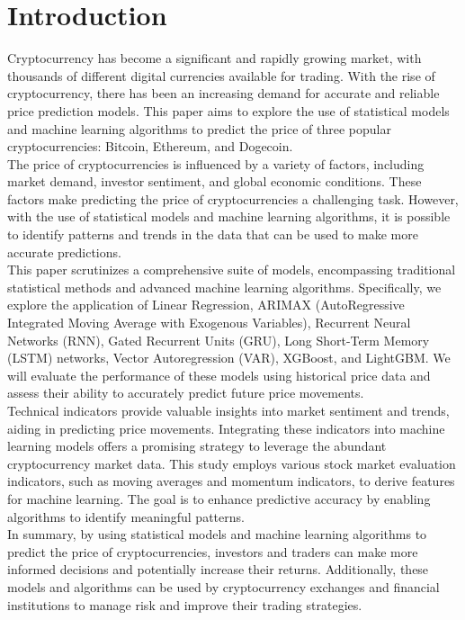 \documentclass{ieeeojies}
\begin{document}
\section{Introduction}
\label{sec:introduction}
\indent Cryptocurrency has become a significant and rapidly growing market, with thousands of different digital currencies available for trading. With the rise of cryptocurrency, there has been an increasing demand for accurate and reliable price prediction models. This paper aims to explore the use of statistical models and machine learning algorithms to predict the price of three popular cryptocurrencies: Bitcoin, Ethereum, and Dogecoin.\\
\indent The price of cryptocurrencies is influenced by a variety of factors, including market demand, investor sentiment, and global economic conditions. These factors make predicting the price of cryptocurrencies a challenging task. However, with the use of statistical models and machine learning algorithms, it is possible to identify patterns and trends in the data that can be used to make more accurate predictions.\\
\indent This paper scrutinizes a comprehensive suite of models, encompassing traditional statistical methods and advanced machine learning algorithms. Specifically, we explore the application of Linear Regression, ARIMAX (AutoRegressive Integrated Moving Average with Exogenous Variables), Recurrent Neural Networks (RNN), Gated Recurrent Units (GRU), Long Short-Term Memory (LSTM) networks, Vector Autoregression (VAR), XGBoost, and LightGBM. We will evaluate the performance of these models using historical price data and assess their ability to accurately predict future price movements.\\
\indent Technical indicators provide valuable insights into market sentiment and trends, aiding in predicting price movements. Integrating these indicators into machine learning models offers a promising strategy to leverage the abundant cryptocurrency market data. This study employs various stock market evaluation indicators, such as moving averages and momentum indicators, to derive features for machine learning. The goal is to enhance predictive accuracy by enabling algorithms to identify meaningful patterns.\\
\indent In summary, by using statistical models and machine learning algorithms to predict the price of cryptocurrencies, investors and traders can make more informed decisions and potentially increase their returns. Additionally, these models and algorithms can be used by cryptocurrency exchanges and financial institutions to manage risk and improve their trading strategies.
\end{document}
